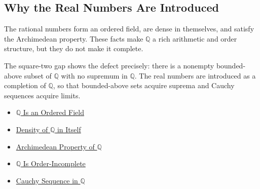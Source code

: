 \subsection*{Why the Real Numbers Are Introduced}

\begin{remark*}
The rational numbers form an ordered field, are dense in themselves, and
satisfy the Archimedean property. These facts make $\mathbb{Q}$ a rich
arithmetic and order structure, but they do not make it complete.

The square-two gap shows the defect precisely: there is a nonempty
bounded-above subset of $\mathbb{Q}$ with no supremum in $\mathbb{Q}$. The real
numbers are introduced as a completion of $\mathbb{Q}$, so that bounded-above
sets acquire suprema and Cauchy sequences acquire limits.
\end{remark*}

\begin{dependencies}
\begin{itemize}
  \item \hyperref[thm:q-is-an-ordered-field]{$\mathbb{Q}$ Is an Ordered Field}
  \item \hyperref[thm:density-of-q]{Density of $\mathbb{Q}$ in Itself}
  \item \hyperref[thm:archimedean-property-of-q]{Archimedean Property of $\mathbb{Q}$}
  \item \hyperref[cor:q-order-incomplete]{$\mathbb{Q}$ Is Order-Incomplete}
  \item \hyperref[def:cauchy-sequence-in-q]{Cauchy Sequence in $\mathbb{Q}$}
\end{itemize}
\end{dependencies}
